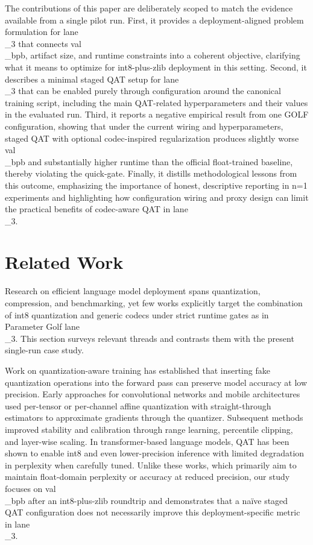 \documentclass{article}
\begin{document}
The contributions of this paper are deliberately scoped to match the evidence available from a single pilot run. First, it provides a deployment-aligned problem formulation for lane\\_3 that connects val\\_bpb, artifact size, and runtime constraints into a coherent objective, clarifying what it means to optimize for int8-plus-zlib deployment in this setting. Second, it describes a minimal staged QAT setup for lane\\_3 that can be enabled purely through configuration around the canonical training script, including the main QAT-related hyperparameters and their values in the evaluated run. Third, it reports a negative empirical result from one GOLF configuration, showing that under the current wiring and hyperparameters, staged QAT with optional codec-inspired regularization produces slightly worse val\\_bpb and substantially higher runtime than the official float-trained baseline, thereby violating the quick-gate. Finally, it distills methodological lessons from this outcome, emphasizing the importance of honest, descriptive reporting in n=1 experiments and highlighting how configuration wiring and proxy design can limit the practical benefits of codec-aware QAT in lane\\_3.

\section{Related Work}

\label{sec:related_work}

Research on efficient language model deployment spans quantization, compression, and benchmarking, yet few works explicitly target the combination of int8 quantization and generic codecs under strict runtime gates as in Parameter Golf lane\\_3. This section surveys relevant threads and contrasts them with the present single-run case study.

Work on quantization-aware training has established that inserting fake quantization operations into the forward pass can preserve model accuracy at low precision. Early approaches for convolutional networks and mobile architectures used per-tensor or per-channel affine quantization with straight-through estimators to approximate gradients through the quantizer. Subsequent methods improved stability and calibration through range learning, percentile clipping, and layer-wise scaling. In transformer-based language models, QAT has been shown to enable int8 and even lower-precision inference with limited degradation in perplexity when carefully tuned. Unlike these works, which primarily aim to maintain float-domain perplexity or accuracy at reduced precision, our study focuses on val\\_bpb after an int8-plus-zlib roundtrip and demonstrates that a naïve staged QAT configuration does not necessarily improve this deployment-specific metric in lane\\_3.
\end{document}
